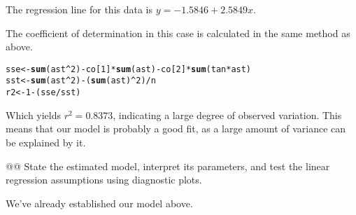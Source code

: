 \documentclass[10pt]{article}\usepackage[]{graphicx}\usepackage[]{xcolor}
\makeatletter
\newcommand{\hlnum}[1]{\textcolor[rgb]{0.686,0.059,0.569}{#1}}%
\newcommand{\hlopt}[1]{\textcolor[rgb]{0,0,0}{#1}}%
\newcommand{\hlstd}[1]{\textcolor[rgb]{0.345,0.345,0.345}{#1}}%
\newcommand{\hlkwb}[1]{\textcolor[rgb]{0.69,0.353,0.396}{#1}}%
\newcommand{\hlkwd}[1]{\textcolor[rgb]{0.737,0.353,0.396}{\textbf{#1}}}%
\newenvironment{kframe}{%
 \def\at@end@of@kframe{}%
 \ifinner\ifhmode%
  \def\at@end@of@kframe{\end{minipage}}%
  \begin{minipage}{\columnwidth}%
 \fi\fi%
 \def\FrameCommand##1{\hskip\@totalleftmargin \hskip-\fboxsep
 \colorbox{shadecolor}{##1}\hskip-\fboxsep
     \hskip-\linewidth \hskip-\@totalleftmargin \hskip\columnwidth}%
 \MakeFramed {\advance\hsize-\width
   \@totalleftmargin\z@ \linewidth\hsize
   \@setminipage}}%
 {\par\unskip\endMakeFramed%
 \at@end@of@kframe}
\newenvironment{knitrout}{}{} %
\makeatother
\begin{document}
\begin{easylist}[enumerate]
    The regression line for this data is $y = -1.5846 + 2.5849x$.\newline

    The coefficient of determination in this case is calculated in the same method as above.

\begin{knitrout}
\color{fgcolor}\begin{kframe}
\begin{alltt}
         \hlstd{sse} \hlkwb{<-} \hlkwd{sum}\hlstd{(ast}\hlopt{^}\hlnum{2}\hlstd{)} \hlopt{-} \hlstd{co[}\hlnum{1}\hlstd{]} \hlopt{*} \hlkwd{sum}\hlstd{(ast)} \hlopt{-} \hlstd{co[}\hlnum{2}\hlstd{]} \hlopt{*} \hlkwd{sum}\hlstd{(tan} \hlopt{*} \hlstd{ast)}
         \hlstd{sst} \hlkwb{<-} \hlkwd{sum}\hlstd{(ast}\hlopt{^}\hlnum{2}\hlstd{)} \hlopt{-} \hlstd{(}\hlkwd{sum}\hlstd{(ast)}\hlopt{^}\hlnum{2}\hlstd{)}\hlopt{/}\hlstd{n}
         \hlstd{r2} \hlkwb{<-} \hlnum{1} \hlopt{-} \hlstd{(sse} \hlopt{/} \hlstd{sst)}
\end{alltt}
\end{kframe}
\end{knitrout}


    Which yields $r^2 = 0.8373$, indicating a large degree of observed variation. This means that our model is
    probably a good fit, as a large amount of variance can be explained by it.

    @@ State the estimated model, interpret its parameters, and test the linear regression assumptions using diagnostic
    plots.\newline

    We've already established our model above.


\end{easylist}
\end{document}
